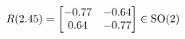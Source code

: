 \documentclass[preview]{standalone}
\begin{document}
\begin{align*}
\special{dvisvgm:raw <g id='unique000'>}R(2.45) = \begin{bmatrix} -0.77 & -0.64 \\ 0.64 & -0.77 \end{bmatrix} \in \text{SO}(2)\special{dvisvgm:raw </g>}
\end{align*}
\end{document}
